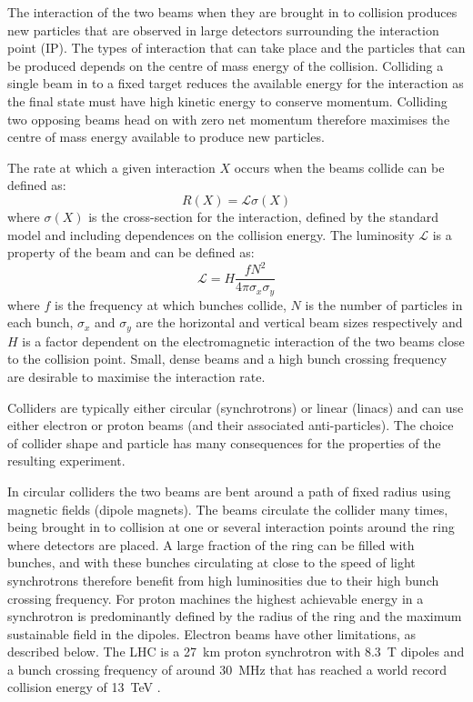 The interaction of the two beams when they are brought in to collision produces new particles that are observed in large detectors surrounding the interaction point (IP). The types of interaction that can take place and the particles that can be produced depends on the centre of mass energy of the collision. Colliding a single beam in to a fixed target reduces the available energy for the interaction as the final state must have high kinetic energy to conserve momentum. Colliding two opposing beams head on with zero net momentum therefore maximises the centre of mass energy available to produce new particles.

The rate at which a given interaction \(X\) occurs when the beams collide can be defined as:
\begin{equation}
R(X) = \mathscr{L} \sigma(X)
\end{equation}
where \(\sigma(X)\) is the cross-section for the interaction, defined by the standard model and including dependences on the collision energy. The luminosity \(\mathscr{L}\) is a property of the beam and can be defined as:
\begin{equation}
\mathscr{L} = H\frac{fN^2}{4\pi\sigma_x\sigma_y}
\end{equation}
where \(f\) is the frequency at which bunches collide, \(N\) is the number of particles in each bunch, \(\sigma_x\) and \(\sigma_y\) are the horizontal and vertical beam sizes respectively and \(H\) is a factor dependent on the electromagnetic interaction of the two beams close to the collision point. Small, dense beams and a high bunch crossing frequency are desirable to maximise the interaction rate.


Colliders are typically either circular (synchrotrons) or linear (linacs) and can use either electron or proton beams (and their associated anti-particles). The choice of collider shape and particle has many consequences for the properties of the resulting experiment. 

In circular colliders the two beams are bent around a path of fixed radius using magnetic fields (dipole magnets). The beams circulate the collider many times, being brought in to collision at one or several interaction points around the ring where detectors are placed. A large fraction of the ring can be filled with bunches, and with these bunches circulating at close to the speed of light synchrotrons therefore benefit from high luminosities due to their high bunch crossing frequency. For proton machines the highest achievable energy in a synchrotron is predominantly defined by the radius of the ring and the maximum sustainable field in the dipoles. Electron beams have other limitations, as described below. The LHC is a 27~km proton synchrotron with 8.3~T dipoles and a bunch crossing frequency of around 30~MHz that has reached a world record collision energy of 13~TeV \cite{LHC}.

